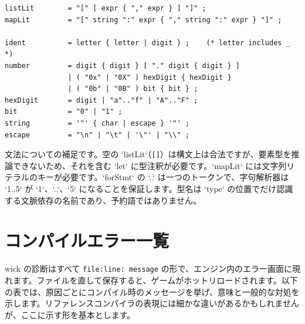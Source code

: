 \begin{lstlisting}[basicstyle=\ttfamily\small,keywordstyle={}]
listLit        = "[" [ expr { "," expr } ] "]" ;
mapLit         = "[" string ":" expr { "," string ":" expr } "]" ;

ident          = letter { letter | digit } ;    (* letter includes _ *)
number         = digit { digit } [ "." digit { digit } ]
               | ( "0x" | "0X" ) hexDigit { hexDigit }
               | ( "0b" | "0B" ) bit { bit } ;
hexDigit       = digit | "a".."f" | "A".."F" ;
bit            = "0" | "1" ;
string         = '"' { char | escape } '"' ;
escape         = "\n" | "\t" | '\"' | "\\" ;
\end{lstlisting}

\noindent
文法についての補足です。空の `listLit`（\texttt{[]}）は構文上は合法ですが、要素型を推論できないため、それを含む `let` に型注釈が必要です。`mapLit` には文字列リテラルのキーが必要です。`forStmt` の `..` は一つのトークンで、字句解析器は `1..5` が `1`、`..`、`5` になることを保証します。型名は `type` の位置でだけ認識する文脈依存の名前であり、予約語ではありません。

\chapter{コンパイルエラー一覧}

wick の診断はすべて \texttt{file:line: message} の形で、エンジン内のエラー画面に現れます。ファイルを直して保存すると、ゲームがホットリロードされます。以下の表では、原因ごとにコンパイル時のメッセージを挙げ、意味と一般的な対処を示します。リファレンスコンパイラの表現には細かな違いがあるかもしれませんが、ここに示す形を基本とします。

